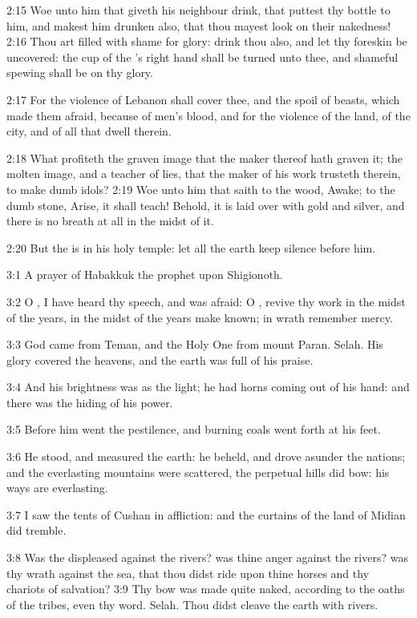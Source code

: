 2:15 Woe unto him that giveth his neighbour drink, that puttest thy bottle to him, and makest him drunken also, that thou mayest look on their nakedness!  2:16 Thou art filled with shame for glory: drink thou also, and let thy foreskin be uncovered: the cup of the \LORD's right hand shall be turned unto thee, and shameful spewing shall be on thy glory.

2:17 For the violence of Lebanon shall cover thee, and the spoil of beasts, which made them afraid, because of men's blood, and for the violence of the land, of the city, and of all that dwell therein.

2:18 What profiteth the graven image that the maker thereof hath graven it; the molten image, and a teacher of lies, that the maker of his work trusteth therein, to make dumb idols?  2:19 Woe unto him that saith to the wood, Awake; to the dumb stone, Arise, it shall teach!  Behold, it is laid over with gold and silver, and there is no breath at all in the midst of it.

2:20 But the \LORD is in his holy temple: let all the earth keep silence before him.

3:1 A prayer of Habakkuk the prophet upon Shigionoth.

3:2 O \LORD, I have heard thy speech, and was afraid: O \LORD, revive thy work in the midst of the years, in the midst of the years make known; in wrath remember mercy.

3:3 God came from Teman, and the Holy One from mount Paran. Selah. His glory covered the heavens, and the earth was full of his praise.

3:4 And his brightness was as the light; he had horns coming out of his hand: and there was the hiding of his power.

3:5 Before him went the pestilence, and burning coals went forth at his feet.

3:6 He stood, and measured the earth: he beheld, and drove asunder the nations; and the everlasting mountains were scattered, the perpetual hills did bow: his ways are everlasting.

3:7 I saw the tents of Cushan in affliction: and the curtains of the land of Midian did tremble.

3:8 Was the \LORD displeased against the rivers? was thine anger against the rivers? was thy wrath against the sea, that thou didst ride upon thine horses and thy chariots of salvation?  3:9 Thy bow was made quite naked, according to the oaths of the tribes, even thy word.  Selah. Thou didst cleave the earth with rivers.

